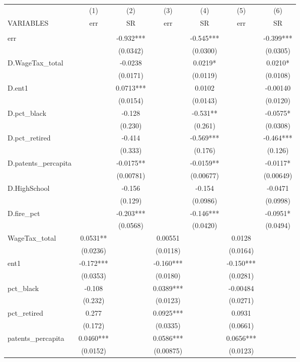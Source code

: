 \begin{tabular}{lcccccc} \hline
 & (1) & (2) & (3) & (4) & (5) & (6) \\
VARIABLES & err & SR & err & SR & err & SR \\ \hline
 &  &  &  &  &  &  \\
err &  & -0.932*** &  & -0.545*** &  & -0.399*** \\
 &  & (0.0342) &  & (0.0300) &  & (0.0305) \\
D.WageTax\_total &  & -0.0238 &  & 0.0219* &  & 0.0210* \\
 &  & (0.0171) &  & (0.0119) &  & (0.0108) \\
D.ent1 &  & 0.0713*** &  & 0.0102 &  & -0.00140 \\
 &  & (0.0154) &  & (0.0143) &  & (0.0120) \\
D.pct\_black &  & -0.128 &  & -0.531** &  & -0.0575* \\
 &  & (0.230) &  & (0.261) &  & (0.0308) \\
D.pct\_retired &  & -0.414 &  & -0.569*** &  & -0.464*** \\
 &  & (0.333) &  & (0.176) &  & (0.126) \\
D.patents\_percapita &  & -0.0175** &  & -0.0159** &  & -0.0117* \\
 &  & (0.00781) &  & (0.00677) &  & (0.00649) \\
D.HighSchool &  & -0.156 &  & -0.154 &  & -0.0471 \\
 &  & (0.129) &  & (0.0986) &  & (0.0998) \\
D.fire\_pct &  & -0.203*** &  & -0.146*** &  & -0.0951* \\
 &  & (0.0568) &  & (0.0420) &  & (0.0494) \\
WageTax\_total & 0.0531** &  & 0.00551 &  & 0.0128 &  \\
 & (0.0236) &  & (0.0118) &  & (0.0164) &  \\
ent1 & -0.172*** &  & -0.160*** &  & -0.150*** &  \\
 & (0.0353) &  & (0.0180) &  & (0.0281) &  \\
pct\_black & -0.108 &  & 0.0389*** &  & -0.00484 &  \\
 & (0.232) &  & (0.0123) &  & (0.0271) &  \\
pct\_retired & 0.277 &  & 0.0925*** &  & 0.0931 &  \\
 & (0.172) &  & (0.0335) &  & (0.0661) &  \\
patents\_percapita & 0.0460*** &  & 0.0586*** &  & 0.0656*** &  \\
 & (0.0152) &  & (0.00875) &  & (0.0123) &  \\

\end{tabular}
